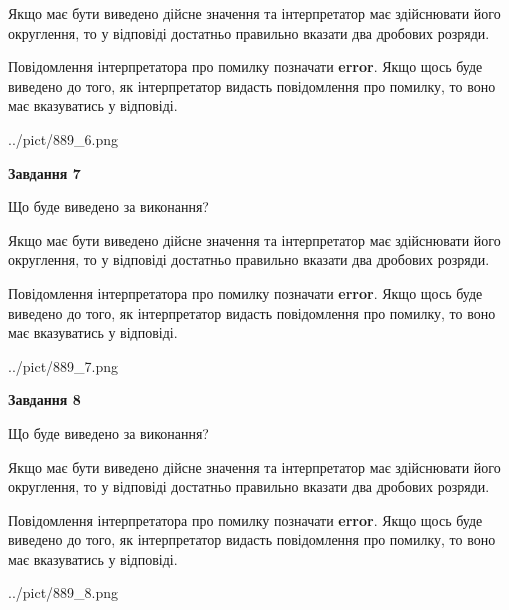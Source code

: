 \documentclass[12pt, ukrainian]{article}
\begin{document}
{\begin {Large}
Якщо має бути виведено дійсне значення та інтерпретатор має здійснювати його округлення, 
то у відповіді достатньо правильно вказати два дробових розряди.

Повідомлення інтерпретатора про помилку позначати \textbf{error}.
Якщо щось буде виведено до того, як інтерпретатор видасть повідомлення про помилку, 
то воно має вказуватись у відповіді. \par

\begin{center}
	{../pict/889_6.png}
\end{center}
\newpage

{\begin {center}\textbf{Завдання 7}\end {center}}\par
Що буде виведено за виконання? \par

Якщо має бути виведено дійсне значення та інтерпретатор має здійснювати його округлення, 
то у відповіді достатньо правильно вказати два дробових розряди.

Повідомлення інтерпретатора про помилку позначати \textbf{error}.
Якщо щось буде виведено до того, як інтерпретатор видасть повідомлення про помилку, 
то воно має вказуватись у відповіді. \par

\begin{center}
	{../pict/889_7.png}
\end{center}
\newpage

{\begin {center}\textbf{Завдання 8}\end {center}}\par
Що буде виведено за виконання? \par

Якщо має бути виведено дійсне значення та інтерпретатор має здійснювати його округлення, 
то у відповіді достатньо правильно вказати два дробових розряди.

Повідомлення інтерпретатора про помилку позначати \textbf{error}.
Якщо щось буде виведено до того, як інтерпретатор видасть повідомлення про помилку, 
то воно має вказуватись у відповіді. \par

\begin{center}
	{../pict/889_8.png}
\end{center}
\newpage


\end{Large}}
\end{document}

